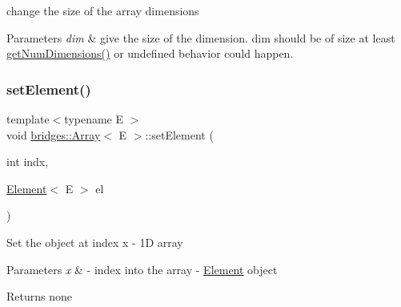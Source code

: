 change the size of the array dimensions 
\begin{DoxyParams}{Parameters}
{\em dim} & give the size of the dimension. dim should be of size at least \mbox{\hyperlink{classbridges_1_1_array_a31edfcff05dd4102fee1840ee915319e}{get\+Num\+Dimensions()}} or undefined behavior could happen. \\
\hline
\end{DoxyParams}
\mbox{\label{classbridges_1_1_array_aae8ec0bd850e00593487022bc914afe0}} 
\subsubsection{\texorpdfstring{set\+Element()}{setElement()}\hspace{0.1cm}{\footnotesize\ttfamily [1/3]}}
{\footnotesize\ttfamily template$<$typename E $>$ \\
void \mbox{\hyperlink{classbridges_1_1_array}{bridges\+::\+Array}}$<$ E $>$\+::set\+Element (\begin{DoxyParamCaption}\item[{int}]{indx,  }\item[{\mbox{\hyperlink{classbridges_1_1_element}{Element}}$<$ E $>$}]{el }\end{DoxyParamCaption})\hspace{0.3cm}{\ttfamily [inline]}}

Set the object at index x -\/ 1D array


\begin{DoxyParams}{Parameters}
{\em x} & -\/ index into the array  -\/ \mbox{\hyperlink{classbridges_1_1_element}{Element}} object\\
\hline
\end{DoxyParams}
\begin{DoxyReturn}{Returns}
none 
\end{DoxyReturn}
\mbox{\label{classbridges_1_1_array_a428cc76d22af71c5ae57dc293780b8ec}} 

